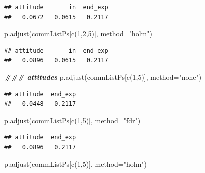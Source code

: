 \documentclass[
]{article}
\newenvironment{Shaded}{\begin{snugshade}}{\end{snugshade}}
\newcommand{\AttributeTok}[1]{\textcolor[rgb]{0.77,0.63,0.00}{#1}}
\newcommand{\DecValTok}[1]{\textcolor[rgb]{0.00,0.00,0.81}{#1}}
\newcommand{\DocumentationTok}[1]{\textcolor[rgb]{0.56,0.35,0.01}{\textbf{\textit{#1}}}}
\newcommand{\FunctionTok}[1]{\textcolor[rgb]{0.00,0.00,0.00}{#1}}
\newcommand{\NormalTok}[1]{#1}
\newcommand{\StringTok}[1]{\textcolor[rgb]{0.31,0.60,0.02}{#1}}
\begin{document}
\begin{verbatim}
## attitude       in  end_exp 
##   0.0672   0.0615   0.2117
\end{verbatim}

\begin{Shaded}
\begin{Highlighting}[]
\FunctionTok{p.adjust}\NormalTok{(commListPs[}\FunctionTok{c}\NormalTok{(}\DecValTok{1}\NormalTok{,}\DecValTok{2}\NormalTok{,}\DecValTok{5}\NormalTok{)], }\AttributeTok{method=}\StringTok{"holm"}\NormalTok{)}
\end{Highlighting}
\end{Shaded}

\begin{verbatim}
## attitude       in  end_exp 
##   0.0896   0.0615   0.2117
\end{verbatim}

\begin{Shaded}
\begin{Highlighting}[]
\DocumentationTok{\#\#\# attitudes}
\FunctionTok{p.adjust}\NormalTok{(commListPs[}\FunctionTok{c}\NormalTok{(}\DecValTok{1}\NormalTok{,}\DecValTok{5}\NormalTok{)], }\AttributeTok{method=}\StringTok{"none"}\NormalTok{)}
\end{Highlighting}
\end{Shaded}

\begin{verbatim}
## attitude  end_exp 
##   0.0448   0.2117
\end{verbatim}

\begin{Shaded}
\begin{Highlighting}[]
\FunctionTok{p.adjust}\NormalTok{(commListPs[}\FunctionTok{c}\NormalTok{(}\DecValTok{1}\NormalTok{,}\DecValTok{5}\NormalTok{)], }\AttributeTok{method=}\StringTok{"fdr"}\NormalTok{)}
\end{Highlighting}
\end{Shaded}

\begin{verbatim}
## attitude  end_exp 
##   0.0896   0.2117
\end{verbatim}

\begin{Shaded}
\begin{Highlighting}[]
\FunctionTok{p.adjust}\NormalTok{(commListPs[}\FunctionTok{c}\NormalTok{(}\DecValTok{1}\NormalTok{,}\DecValTok{5}\NormalTok{)], }\AttributeTok{method=}\StringTok{"holm"}\NormalTok{)}
\end{Highlighting}
\end{Shaded}
\end{document}
